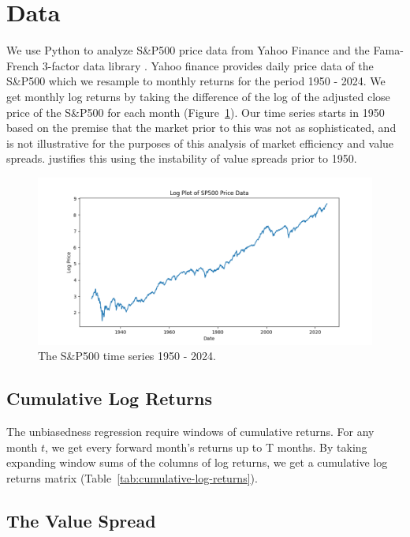 \section{Data}
\label{sec:data}

We use Python \citep{python3} to analyze S\&P500 price data from Yahoo Finance \citep{yahoo_finance_gspc} and the Fama-French 3-factor data library \citep{french_website}.
Yahoo finance provides daily price data of the S\&P500 which we resample to monthly returns for the period 1950 - 2024. We get monthly log returns by taking the
difference of the log of the adjusted close price of the S\&P500 for each month (Figure~\ref{fig:sp500-returns}). Our time series starts in 1950
based on the premise that the market prior to this was not as sophisticated, and is not illustrative for the purposes of this analysis of market efficiency and value spreads. \citep{asness_2024} justifies this using the 
instability of value spreads prior to 1950.

\begin{figure}[h!]
    \centering
    \includegraphics[width=1\textwidth]{../data/03-analysis_data_visuals/sp500_log_price.png}
    \caption{The S\&P500 time series 1950 - 2024.}
    \label{fig:sp500-returns}
\end{figure}

\subsection{Cumulative Log Returns}

The unbiasedness regression require windows of cumulative returns. For any month $t$, we get every forward month's returns up to T months.
By taking expanding window sums of the columns of log returns, we get a cumulative log returns matrix (Table~\ref{tab:cumulative-log-returns}).

\subsection{The Value Spread}

